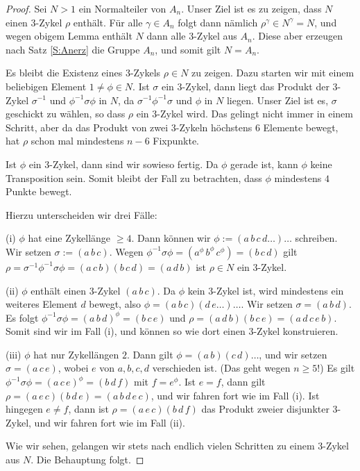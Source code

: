 \documentclass[12pt,a4paper,twoside]{article}
\begin{document}
\begin{proof}
  Sei $N>1$ ein Normalteiler von $A_n$. Unser Ziel ist es zu zeigen, dass $N$
  einen $3$-Zykel $\rho$ enth\"alt. F\"ur alle $\gamma\in A_n$ folgt dann
  n\"amlich $\rho^\gamma\in N^\gamma=N$, und wegen obigem Lemma enth\"alt $N$
  dann alle $3$-Zykel aus $A_n$. Diese aber erzeugen nach Satz \ref{S:Anerz}
  die Gruppe $A_n$, und somit gilt $N=A_n$.
  
  Es bleibt die Existenz eines $3$-Zykels $\rho\in N$ zu zeigen. Dazu starten
  wir mit einem beliebigen Element $1\ne\phi\in N$. Ist $\sigma$ ein
  $3$-Zykel, dann liegt das Produkt der $3$-Zykel $\sigma^{-1}$ und
  $\phi^{-1}\sigma\phi$ in $N$, da $\sigma^{-1}\phi^{-1}\sigma$ und $\phi$ in
  $N$ liegen. Unser Ziel ist es, $\sigma$ geschickt zu w\"ahlen, so dass
  $\rho$ ein $3$-Zykel wird. Das gelingt nicht immer in einem Schritt, aber da
  das Produkt von zwei $3$-Zykeln h\"ochstens $6$ Elemente bewegt, hat $\rho$
  schon mal mindestens $n-6$ Fixpunkte.
  
  Ist $\phi$ ein $3$-Zykel, dann sind wir sowieso fertig. Da $\phi$ gerade
  ist, kann $\phi$ keine Transposition sein.  Somit bleibt der Fall zu
  betrachten, dass $\phi$ mindestens $4$ Punkte bewegt.
  
  Hierzu unterscheiden wir drei F\"alle:

(i) $\phi$ hat eine Zykell\"ange $\ge4$. Dann k\"onnen wir
$\phi:=(a\,b\,c\,d\dots)\dots$ schreiben. Wir setzen
$\sigma:=(a\,b\,c)$. Wegen
$\phi^{-1}\sigma\phi=(a^\phi\,b^\phi\,c^\phi)=(b\,c\,d)$ gilt
$\rho=\sigma^{-1}\phi^{-1}\sigma\phi=(a\,c\,b)(b\,c\,d)=(a\,d\,b)$ ist
$\rho\in N$ ein $3$-Zykel.

(ii) $\phi$ enth\"alt einen $3$-Zykel $(a\,b\,c)$. Da $\phi$ kein $3$-Zykel
ist, wird mindestens ein weiteres Element $d$ bewegt, also
$\phi=(a\,b\,c)(d\,e\dots)\dots$. Wir setzen $\sigma=(a\,b\,d)$. Es folgt
$\phi^{-1}\sigma\phi=(a\,b\,d)^\phi=(b\,c\,e)$ und
$\rho=(a\,d\,b)(b\,c\,e)=(a\,d\,c\,e\,b)$. Somit sind wir im Fall (i), und
k\"onnen so wie dort einen $3$-Zykel konstruieren.

(iii) $\phi$ hat nur Zykell\"angen $2$. Dann gilt $\phi=(a\,b)(c\,d)\dots$,
und wir setzen $\sigma=(a\,c\,e)$, wobei $e$ von $a,b,c,d$ verschieden ist.
(Das geht wegen $n\ge5$!) Es gilt
$\phi^{-1}\sigma\phi=(a\,c\,e)^\phi=(b\,d\,f)$ mit $f=e^\phi$. Ist $e=f$, dann
gilt $\rho=(a\,e\,c)(b\,d\,e)=(a\,b\,d\,e\,c)$, und wir fahren fort wie im
Fall (i). Ist hingegen $e\ne f$, dann ist $\rho=(a\,e\,c)(b\,d\,f)$ das
Produkt zweier disjunkter $3$-Zykel, und wir fahren fort wie im Fall (ii).

Wie wir sehen, gelangen wir stets nach endlich vielen Schritten zu einem
$3$-Zykel aus $N$. Die Behauptung folgt.
\end{proof}
\end{document}
